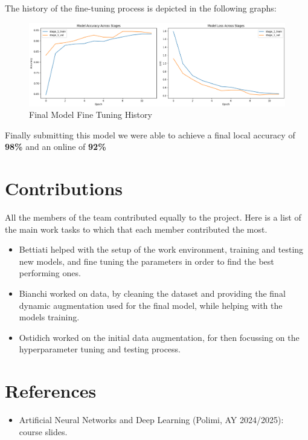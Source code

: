\documentclass[11pt]{article}
\begin{document}
The history of the fine-tuning process is depicted in the following graphs:  
\begin{figure}[h!]
    \centering
    \includegraphics[width=\textwidth]{images/final_model_history.png}
    \caption{Final Model Fine Tuning History}
\end{figure}

Finally submitting this model we were able to achieve a final local accuracy of \textbf{98\%} and an online of \textbf{92\%}

\section{Contributions}

All the members of the team contributed equally to the project. 
Here is a list of the main work tasks to which that each member contributed the most.

\begin{itemize}
    \item Bettiati helped with the setup of the work environment, training and testing new models, and fine tuning the parameters in order to find the best performing ones.
    \item Bianchi worked on data, by cleaning the dataset and providing the final dynamic augmentation used for the final model, while helping with the models training.
    \item Ostidich worked on the initial data augmentation, for then focussing on the hyperparameter tuning and testing process.
\end{itemize}

\section{References}

\begin{itemize}
    \item Artificial Neural Networks and Deep Learning (Polimi, AY 2024/2025): course slides.
\end{itemize}
\end{document}
